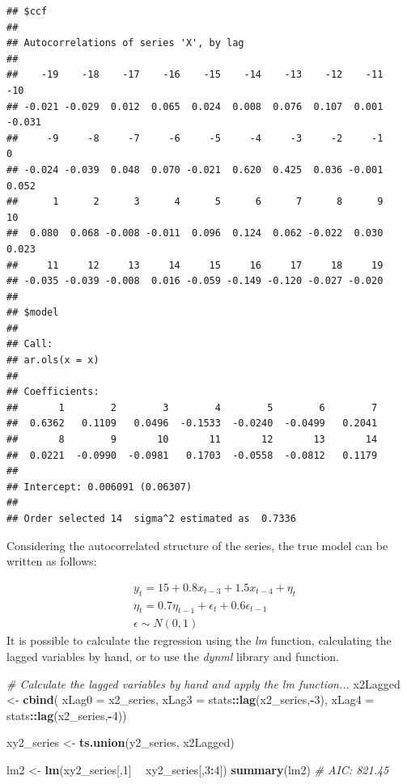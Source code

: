 \documentclass[
]{article}
\newenvironment{Shaded}{\begin{snugshade}}{\end{snugshade}}
\newcommand{\CommentTok}[1]{\textcolor[rgb]{0.56,0.35,0.01}{\textit{#1}}}
\newcommand{\DataTypeTok}[1]{\textcolor[rgb]{0.13,0.29,0.53}{#1}}
\newcommand{\DecValTok}[1]{\textcolor[rgb]{0.00,0.00,0.81}{#1}}
\newcommand{\KeywordTok}[1]{\textcolor[rgb]{0.13,0.29,0.53}{\textbf{#1}}}
\newcommand{\NormalTok}[1]{#1}
\newcommand{\OperatorTok}[1]{\textcolor[rgb]{0.81,0.36,0.00}{\textbf{#1}}}
\newcommand{\StringTok}[1]{\textcolor[rgb]{0.31,0.60,0.02}{#1}}
\begin{document}
\begin{verbatim}
## $ccf
## 
## Autocorrelations of series 'X', by lag
## 
##    -19    -18    -17    -16    -15    -14    -13    -12    -11    -10 
## -0.021 -0.029  0.012  0.065  0.024  0.008  0.076  0.107  0.001 -0.031 
##     -9     -8     -7     -6     -5     -4     -3     -2     -1      0 
## -0.024 -0.039  0.048  0.070 -0.021  0.620  0.425  0.036 -0.001  0.052 
##      1      2      3      4      5      6      7      8      9     10 
##  0.080  0.068 -0.008 -0.011  0.096  0.124  0.062 -0.022  0.030  0.023 
##     11     12     13     14     15     16     17     18     19 
## -0.035 -0.039 -0.008  0.016 -0.059 -0.149 -0.120 -0.027 -0.020 
## 
## $model
## 
## Call:
## ar.ols(x = x)
## 
## Coefficients:
##       1        2        3        4        5        6        7  
##  0.6362   0.1109   0.0496  -0.1533  -0.0240  -0.0499   0.2041  
##       8        9       10       11       12       13       14  
##  0.0221  -0.0990  -0.0981   0.1703  -0.0558  -0.0812   0.1179  
## 
## Intercept: 0.006091 (0.06307) 
## 
## Order selected 14  sigma^2 estimated as  0.7336
\end{verbatim}

Considering the autocorrelated structure of the series, the true model can be written as follows:

\[
\begin{aligned} 
& y_t = 15 + 0.8x_{t-3} + 1.5x_{t-4} + \eta_t \\
& \eta_t = 0.7\eta_{t-1} + \epsilon_t + 0.6\epsilon_{t-1} \\
& \epsilon \sim N(0, 1)
\end{aligned} 
\]
It is possible to calculate the regression using the \emph{lm} function, calculating the lagged variables by hand, or to use the \emph{dynml} library and function.

\begin{Shaded}
\begin{Highlighting}[]
\CommentTok{# Calculate the lagged variables by hand and apply the lm function...}
\NormalTok{x2Lagged <-}\StringTok{ }\KeywordTok{cbind}\NormalTok{(}
    \DataTypeTok{xLag0 =}\NormalTok{ x2_series,}
    \DataTypeTok{xLag3 =}\NormalTok{ stats}\OperatorTok{::}\KeywordTok{lag}\NormalTok{(x2_series,}\OperatorTok{-}\DecValTok{3}\NormalTok{),}
    \DataTypeTok{xLag4 =}\NormalTok{ stats}\OperatorTok{::}\KeywordTok{lag}\NormalTok{(x2_series,}\OperatorTok{-}\DecValTok{4}\NormalTok{))}

\NormalTok{xy2_series <-}\StringTok{ }\KeywordTok{ts.union}\NormalTok{(y2_series, x2Lagged)}

\NormalTok{lm2 <-}\StringTok{ }\KeywordTok{lm}\NormalTok{(xy2_series[,}\DecValTok{1}\NormalTok{] }\OperatorTok{~}\StringTok{ }\NormalTok{xy2_series[,}\DecValTok{3}\OperatorTok{:}\DecValTok{4}\NormalTok{])}
\KeywordTok{summary}\NormalTok{(lm2) }\CommentTok{# AIC: 821.45}
\end{Highlighting}
\end{Shaded}
\end{document}

